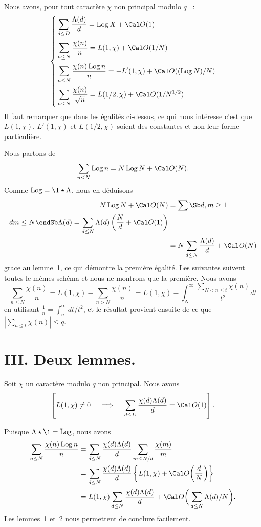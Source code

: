 Nous avons, pour tout caract\`ere $\chi$ non principal modulo $q$ ~:
$$
\left\{\aligned
&\sum_{d\le D}\frac{\Lambda(d)}{d}=\Log X+\Cal O(1)
\\&
\sum_{n\le N}\frac{\chi(n)}{n}= L(1,\chi)+\Cal O(1/N)
\\&
\sum_{n\le N}\frac{\chi(n)\Log n}{n}= -L'(1,\chi)+\Cal O((\Log N)/N)
\\&
\sum_{n\le N}\frac{\chi(n)}{\sqrt{n}}= L(1/2,\chi)+\Cal O(1/N^{1/2})
\endaligned\right.
$$
\endproclaim
Il faut remarquer que dans les \'egalit\'es ci-dessus, ce qui nous
int\'eresse c'est que $L(1,\chi)$, $L'(1,\chi)$ et $L(1/2,\chi)$
soient des constantes et non leur forme particuli\`ere.

Nous partons de
$$
\sum_{n\le N}\Log n=N\Log N+\Cal O(N).
$$
Comme $\Log=\1\star\Lambda$, nous en d\'eduisons
$$
\aligned
N\Log N+\Cal O(N)
&=\sum\Sb d,m\ge 1\\ dm\le N\endSb\Lambda(d)
=
\sum_{ d\le N}\Lambda(d)\left(
\frac{N}{d}+\Cal O(1)
\right)
\\&=N\sum_{d\le N}\frac{\Lambda(d)}{d}+\Cal O(N)
\endaligned
$$
grace au lemme~1, ce qui d\'emontre la premi\`ere \'egalit\'e.
Les suivantes suivent toutes le m\^emes sch\'ema et nous ne montrons
que la premi\`ere. Nous avons
$$
\sum_{n\le N}\frac{\chi(n)}{n}
=L(1,\chi)-\sum_{n>N}\frac{\chi(n)}{n}
=L(1,\chi)-\int_{N}^{\infty}\frac{\sum_{N<n\le t}\chi(n)}{t^2}dt
$$
en utilisant
$\frac1n=\int_n^{\infty}dt/t^2$,
et le r\'esultat provient ensuite de ce que $|\sum_{n\le t}\chi(n)|\le q$.
\fin

\section{III. Deux lemmes.}

Soit $\chi$ un caract\`ere modulo $q$ non principal.
Nous avons
$$
\left[L(1,\chi)\neq0\quad\implies\quad
\sum_{d\le D}\frac{\chi(d)\Lambda(d)}{d}=\Cal O(1)\right].
$$
\endproclaim

Puisque $\Lambda\star\1=\Log$, nous avons
$$
\aligned
\sum_{n\le N}\frac{\chi(n)\Log n}{n}
&=
\sum_{d\le N}\frac{\chi(d)\Lambda(d)}{d}\sum_{m\le
N/d}\frac{\chi(m)}{m}
\\&=
\sum_{d\le N}\frac{\chi(d)\Lambda(d)}{d}
\left\{
L(1,\chi)+\Cal O\bigg(\frac{d}{N}\bigg)
\right\}
\\&=
L(1,\chi)\sum_{d\le N}\frac{\chi(d)\Lambda(d)}{d}
+\Cal O\bigg(\sum_{d\le N}\Lambda(d)/N\bigg).
\endaligned
$$
Les lemmes~1 et~2 nous permettent de conclure
facilement.
\fin

